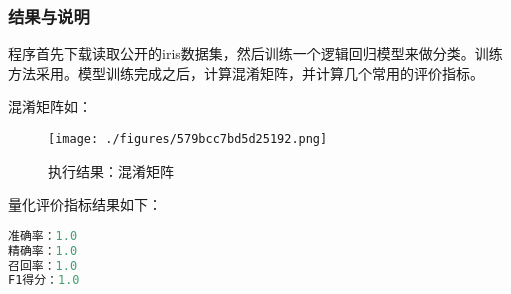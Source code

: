 \subsubsection{结果与说明}
程序首先下载读取公开的iris数据集，然后训练一个逻辑回归模型来做分类。训练方法采用。模型训练完成之后，计算混淆矩阵，并计算几个常用的评价指标。

混淆矩阵如：
\begin{figure}[ht]
\centering
\texttt{[image: ./figures/579bcc7bd5d25192.png]}
\caption{执行结果：混淆矩阵} \label{fig_ConMat_1}
\end{figure}

量化评价指标结果如下：
\begin{lstlisting}[language=python]
准确率：1.0
精确率：1.0
召回率：1.0
F1得分：1.0
\end{lstlisting}